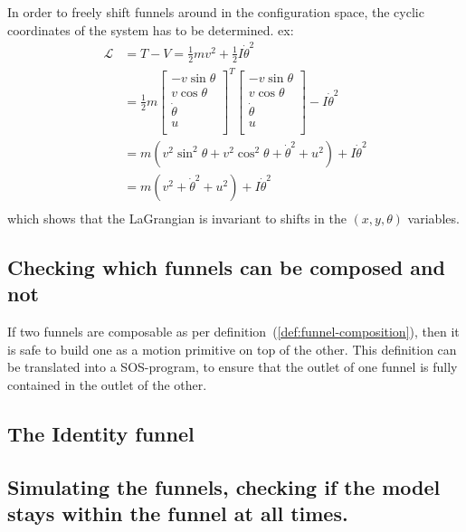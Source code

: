 In order to freely shift funnels around in the configuration space, the cyclic
coordinates of the system has to be determined. ex:
\begin{align}
  \mathcal{L} &= T - V = \frac{1}{2} mv^2 + \frac{1}{2}I\dot{\theta}^2 \\ 
              &= \frac{1}{2} 
                m\begin{bmatrix}
                  -v\sin \theta \\ 
                  v \cos \theta \\
                  \dot{\theta} \\
                  u \\
              \end{bmatrix}^{T} 
  \begin{bmatrix}
                  -v\sin \theta \\ 
                  v \cos \theta \\
                  \dot{\theta} \\
                  u \\
                \end{bmatrix}
  - I\dot{\theta}^2 \\
              &= m \left(
                v^2 \sin^2 \theta + v^2 \cos^2 \theta + {\dot{\theta}}^2 + u^2
                \right)  + I {\dot{\theta}}^2 \\
              &= m(v^2 + {\dot{\theta}}^2 + u^2) + I {\dot{\theta}}^2 \\
\end{align}
which shows that the LaGrangian is invariant to shifts in the \((x,y,\theta)\)
variables. 

\subsection{Checking which funnels can be composed and not}

If two funnels are composable as per definition~(\ref{def:funnel-composition}),
then it is safe to build one as a motion primitive on top of the other. This
definition can be translated into a \ac{SOS}-program, to ensure that the outlet
of one funnel is fully contained in the outlet of the other.

\subsection{The Identity funnel}

\subsection{Simulating the funnels, checking if the model stays within the
  funnel at all times.}

